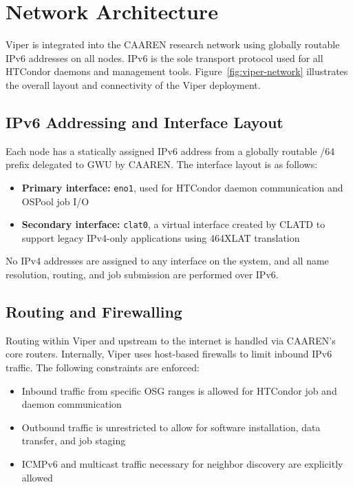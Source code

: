 \documentclass[11pt]{article}
\begin{document}


\section{Network Architecture}

Viper is integrated into the CAAREN research network using globally routable IPv6 addresses on all nodes. IPv6 is the sole transport protocol used for all HTCondor daemons and management tools. Figure~\ref{fig:viper-network} illustrates the overall layout and connectivity of the Viper deployment.

\subsection{IPv6 Addressing and Interface Layout}

Each node has a statically assigned IPv6 address from a globally routable /64 prefix delegated to GWU by CAAREN. The interface layout is as follows:
\begin{itemize}[leftmargin=*,label=--,itemsep=1pt]
    \item \textbf{Primary interface:} \texttt{eno1}, used for HTCondor daemon communication and OSPool job I/O
    \item \textbf{Secondary interface:} \texttt{clat0}, a virtual interface created by CLATD to support legacy IPv4-only applications using 464XLAT translation
\end{itemize}

No IPv4 addresses are assigned to any interface on the system, and all name resolution, routing, and job submission are performed over IPv6.

\subsection{Routing and Firewalling}

Routing within Viper and upstream to the internet is handled via CAAREN’s core routers. Internally, Viper uses host-based firewalls to limit inbound IPv6 traffic. The following constraints are enforced:
\begin{itemize}[leftmargin=*,label=--,itemsep=1pt]
    \item Inbound traffic from specific OSG ranges is allowed for HTCondor job and daemon communication
    \item Outbound traffic is unrestricted to allow for software installation, data transfer, and job staging
    \item ICMPv6 and multicast traffic necessary for neighbor discovery are explicitly allowed
\end{itemize}
\end{document}
